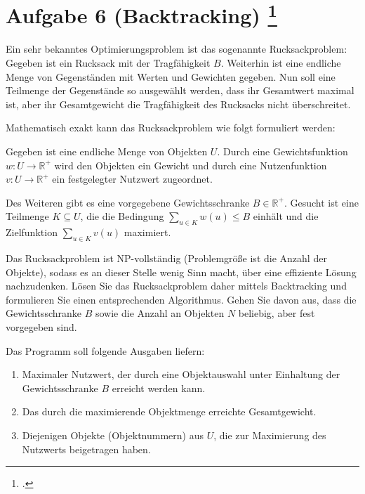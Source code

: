 \documentclass{bschlangaul-aufgabe}
\begin{document}

\section{Aufgabe 6 (Backtracking)
\footcite[Thema 2 Aufgabe 6 Seite 10]{examen:66115:2018:09}
}

Ein sehr bekanntes Optimierungsproblem ist das sogenannte
Rucksackproblem: Gegeben ist ein Rucksack mit der Tragfähigkeit $B$.
Weiterhin ist eine endliche Menge von Gegenständen mit Werten und
Gewichten gegeben. Nun soll eine Teilmenge der Gegenstände so ausgewählt
werden, dass ihr Gesamtwert maximal ist, aber ihr Gesamtgewicht die
Tragfähigkeit des Rucksacks nicht überschreitet.

Mathematisch exakt kann das Rucksackproblem wie folgt formuliert werden:

Gegeben ist eine endliche Menge von Objekten $U$. Durch eine
Gewichtsfunktion $w \colon U \rightarrow \mathbb{R}^+$ wird den Objekten
ein Gewicht und durch eine Nutzenfunktion $v \colon U \rightarrow
\mathbb{R}^+$ ein festgelegter Nutzwert zugeordnet.

Des Weiteren gibt es eine vorgegebene Gewichtsschranke $B \in
\mathbb{R}^+$. Gesucht ist eine Teilmenge $K \subseteq U$, die die
Bedingung $\sum_{u \in K} w(u) \leq B$ einhält und die Zielfunktion
$\sum_{u \in K} v(u)$ maximiert.

Das Rucksackproblem ist NP-vollständig (Problemgröße ist die Anzahl der
Objekte), sodass es an dieser Stelle wenig Sinn macht, über eine
effiziente Lösung nachzudenken. Lösen Sie das Rucksackproblem daher
mittels Backtracking und formulieren Sie einen entsprechenden
Algorithmus. Gehen Sie davon aus, dass die Gewichtsschranke $B$ sowie
die Anzahl an Objekten $N$ beliebig, aber fest vorgegeben sind.

\bigskip

\noindent
Das Programm soll folgende Ausgaben liefern:

\begin{enumerate}
\item Maximaler Nutzwert, der durch eine Objektauswahl unter Einhaltung
der Gewichtsschranke $B$ erreicht werden kann.

\item Das durch die maximierende Objektmenge erreichte Gesamtgewicht.

\item Diejenigen Objekte (Objektnummern) aus $U$, die zur Maximierung
des Nutzwerts beigetragen haben.

\end{enumerate}

\begin{liAntwort}
\end{liAntwort}
\end{document}
